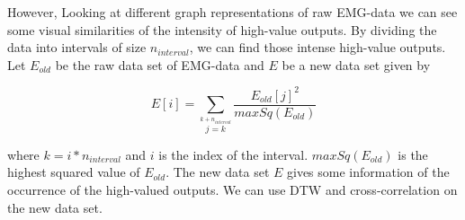 However, Looking at different graph representations of raw EMG-data we can see some visual similarities of the intensity of high-value outputs. By dividing the data into intervals of size $n_{interval}$, we can find those intense high-value outputs. Let $E_{old}$ be the raw data set of EMG-data and $E$ be a new data set given by 

\begin{equation*}
    E[i] = \sum\limits_{j=k}\limits^{k + n_{interval}}\frac{E_{old}[j]^2}{maxSq(E_{old})} 
\end{equation*}

where $k = i*n_{interval}$ and $i$ is the index of the interval. $maxSq(E_{old})$ is the highest squared value of $E_{old}$. The new data set $E$ gives some information of the occurrence of the high-valued outputs. We can use DTW and cross-correlation on the new data set.